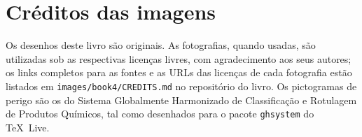 \chapter*{Créditos das imagens}

Os desenhos deste livro são originais. As fotografias, quando usadas, são
utilizadas sob as respectivas licenças livres, com agradecimento aos seus
autores; os links completos para as fontes e as URLs das licenças de cada
fotografia estão listados em \texttt{images/book4/CREDITS.md} no
repositório do livro.
Os pictogramas de perigo são os do Sistema Globalmente Harmonizado de
Classificação e Rotulagem de Produtos Químicos, tal como desenhados para o
pacote \texttt{ghsystem} do \TeX\ Live.

